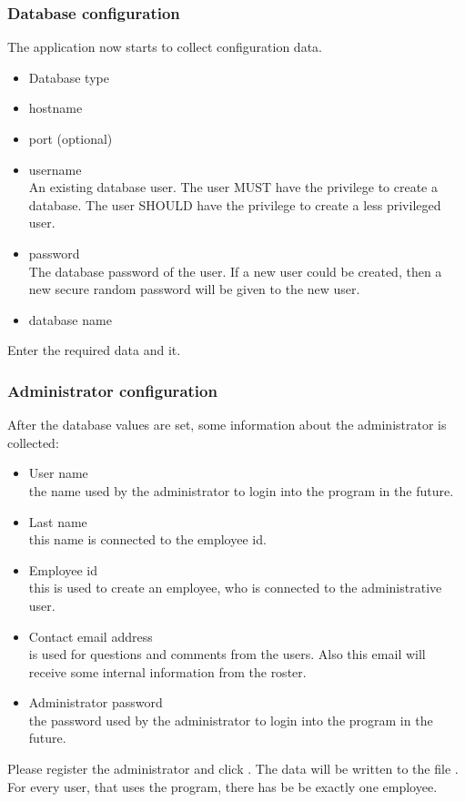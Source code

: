 \subsubsection{Database configuration}
The application now starts to collect configuration data.
\begin{itemize}
\item Database type
\item hostname
\item port (optional)
\item username \\An existing database user. The user MUST have the privilege to create a database. The user SHOULD have the privilege to create a less privileged user.
\item password \\The database password of the user. If a new user could be created, then a new secure random password will be given to the new user.
\item database name
\end{itemize}
Enter the required data and  it.

\subsubsection{Administrator configuration}
After the database values are set, some information about the administrator is collected:
\begin{itemize}
    \item User name\\ the name used by the administrator to login into the program in the future. 
    \item Last name\\ this name is connected to the employee id.
    \item Employee id\\ this is used to create an employee, who is connected to the administrative user.
    \item Contact email address\\ is used for questions and comments from the users. Also this email will receive some internal information from the roster.
    \item Administrator password\\ the password used by the administrator to login into the program in the future. 
\end{itemize}
Please register the administrator and click .
The data will be written to the file .
For every user, that uses the program, there has be be exactly one employee. 
